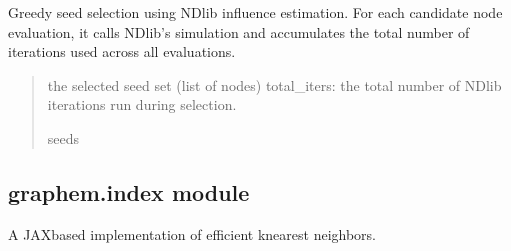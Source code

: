 \documentclass[letterpaper,10pt,english]{sphinxmanual}
\begin{document}

\begin{fulllineitems}
\label{\detokenize{api_reference:id35}}
\pysigstartsignatures
{}
\pysigstopsignatures
\sphinxAtStartPar
Greedy seed selection using NDlib influence estimation.
For each candidate node evaluation, it calls NDlib’s simulation and accumulates
the total number of iterations used across all evaluations.
\begin{quote}\begin{description}
\sphinxAtStartPar
the selected seed set (list of nodes)
total\_iters: the total number of NDlib iterations run during selection.

\sphinxAtStartPar
seeds

\end{description}\end{quote}

\end{fulllineitems}



\subsection{graphem.index module}
\label{\detokenize{api_reference:module-graphem.index}}\label{\detokenize{api_reference:graphem-index-module}}
\sphinxAtStartPar
A JAX\sphinxhyphen{}based implementation of efficient k\sphinxhyphen{}nearest neighbors.
\end{document}
